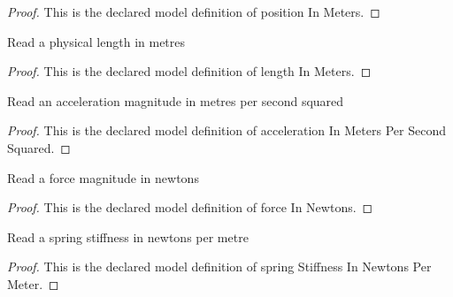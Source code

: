 \begin{proof}
  This is the declared model definition of position In Meters.
\end{proof}
\begin{definition}
  \label{def:physics:phyx-mini-0695:phyxminiproblems-problemphyxmini0695-lengthinmeters}
  Read a physical length in metres
\end{definition}
\begin{proof}
  This is the declared model definition of length In Meters.
\end{proof}
\begin{definition}
  \label{def:physics:phyx-mini-0695:phyxminiproblems-problemphyxmini0695-accelerationinmeterspersecondsquared}
  Read an acceleration magnitude in metres per second squared
\end{definition}
\begin{proof}
  This is the declared model definition of acceleration In Meters Per Second Squared.
\end{proof}
\begin{definition}
  \label{def:physics:phyx-mini-0695:phyxminiproblems-problemphyxmini0695-forceinnewtons}
  Read a force magnitude in newtons
\end{definition}
\begin{proof}
  This is the declared model definition of force In Newtons.
\end{proof}
\begin{definition}
  \label{def:physics:phyx-mini-0695:phyxminiproblems-problemphyxmini0695-springstiffnessinnewtonspermeter}
  Read a spring stiffness in newtons per metre
\end{definition}
\begin{proof}
  This is the declared model definition of spring Stiffness In Newtons Per Meter.
\end{proof}
